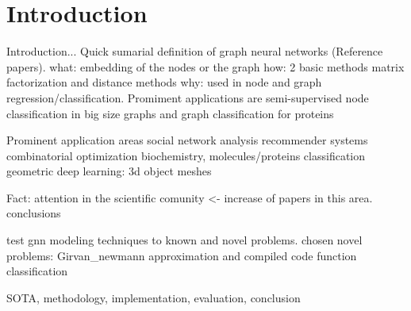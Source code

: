
\section{Introduction}

Introduction...
Quick sumarial definition of graph neural networks (Reference papers).
	what: embedding of the nodes or the graph
	how: 2 basic methods matrix factorization and distance methods
	why: used in node and graph regression/classification. Promiment applications are semi-supervised node classification in big size graphs and graph classification for proteins

Prominent application areas
	social network analysis
	recommender systems
	combinatorial optimization
	biochemistry, molecules/proteins classification
	geometric deep learning: 3d object meshes


	Fact: attention in the scientific comunity <- increase of papers in this area.
	conclusions

	test gnn modeling techniques to known and novel problems. chosen novel problems: Girvan_newmann approximation and compiled code function classification

	SOTA, methodology, implementation, evaluation, conclusion